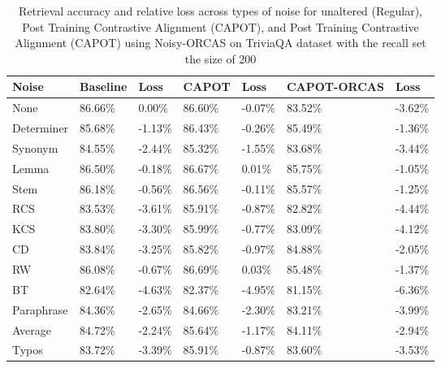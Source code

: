 \begin{table*}[!ht]
    \centering
    \begin{tabular}{|l|l|l|l|l|l|l|}
    \hline
        Noise & Baseline & Loss & CAPOT & Loss & CAPOT-ORCAS & Loss \\ \hline
        None & 86.66\% & 0.00\% & 86.60\% & -0.07\% & 83.52\% & -3.62\% \\ \hline
        Determiner & 85.68\% & -1.13\% & 86.43\% & -0.26\% & 85.49\% & -1.36\% \\ \hline
        Synonym & 84.55\% & -2.44\% & 85.32\% & -1.55\% & 83.68\% & -3.44\% \\ \hline
        Lemma & 86.50\% & -0.18\% & 86.67\% & 0.01\% & 85.75\% & -1.05\% \\ \hline
        Stem & 86.18\% & -0.56\% & 86.56\% & -0.11\% & 85.57\% & -1.25\% \\ \hline
        RCS & 83.53\% & -3.61\% & 85.91\% & -0.87\% & 82.82\% & -4.44\% \\ \hline
        KCS & 83.80\% & -3.30\% & 85.99\% & -0.77\% & 83.09\% & -4.12\% \\ \hline
        CD & 83.84\% & -3.25\% & 85.82\% & -0.97\% & 84.88\% & -2.05\% \\ \hline
        RW & 86.08\% & -0.67\% & 86.69\% & 0.03\% & 85.48\% & -1.37\% \\ \hline
        BT & 82.64\% & -4.63\% & 82.37\% & -4.95\% & 81.15\% & -6.36\% \\ \hline
        Paraphrase & 84.36\% & -2.65\% & 84.66\% & -2.30\% & 83.21\% & -3.99\% \\ \hline
        Average & 84.72\% & -2.24\% & 85.64\% & -1.17\% & 84.11\% & -2.94\% \\ \hline
        Typos & 83.72\% & -3.39\% & 85.91\% & -0.87\% & 83.60\% & -3.53\% \\ \hline
    \end{tabular}
    \caption{Retrieval accuracy and relative loss across types of noise for unaltered (Regular),  Post Training Contrastive Alignment (CAPOT), and Post Training Contrastive Alignment (CAPOT) using Noisy-ORCAS on TriviaQA dataset with the recall set the size of 200}
    \label{tab:capot-orcasvsnot-200}
\end{table*}

